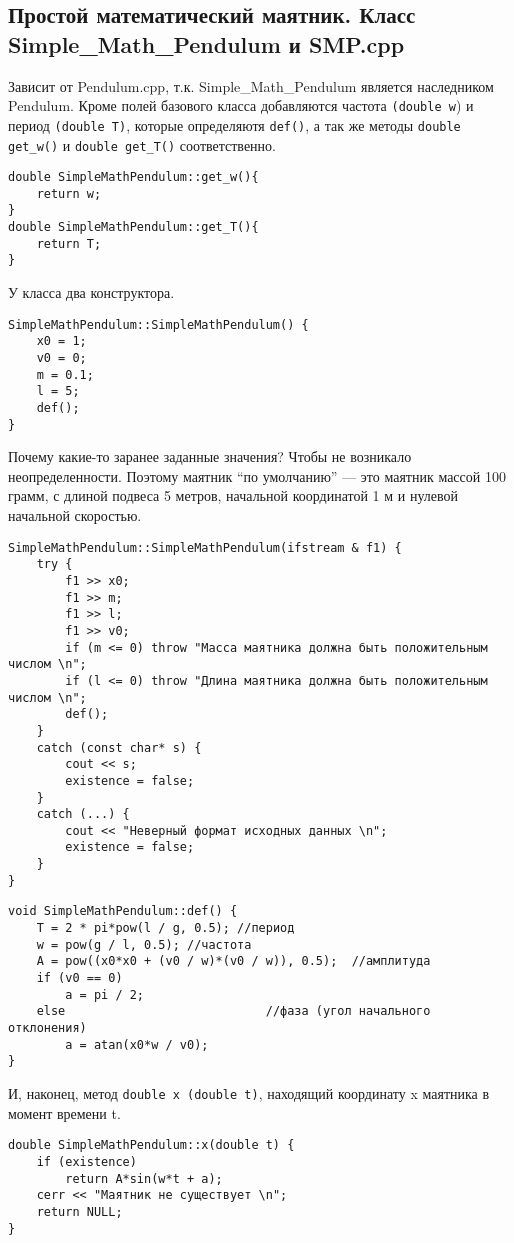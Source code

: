\documentclass {report}
\begin{document}
\subsection{Простой математический маятник. Класс Simple\_Math\_Pendulum и SMP.cpp}
Зависит от Pendulum.cpp, т.к. Simple\_Math\_Pendulum является наследником Pendulum. Кроме полей базового класса добавляются частота \texttt{(double w}) и период \texttt{(double T)}, которые определяютя \texttt{def()}, а так же методы \texttt{double get\_w()} и \texttt{double get\_T()} соответственно. 
\begin{lstlisting}
double SimpleMathPendulum::get_w(){
	return w;
}
double SimpleMathPendulum::get_T(){
	return T;
}
\end{lstlisting}
\newpage
У класса два конструктора.
\begin{lstlisting}[caption = Так определится простой математический маятник по умолчанию]
SimpleMathPendulum::SimpleMathPendulum() {
	x0 = 1;
	v0 = 0;
	m = 0.1;
	l = 5;
	def();
}
\end{lstlisting}
Почему какие-то заранее заданные значения? Чтобы не возникало неопределенности. Поэтому маятник ``по умолчанию'' --- это маятник массой 100 грамм, с длиной подвеса 5 метров, начальной координатой 1 м и нулевой начальной скоростью. 
\begin{lstlisting}[caption = Так можно считать маятник из файлового потока]
SimpleMathPendulum::SimpleMathPendulum(ifstream & f1) {
	try {
		f1 >> x0;
		f1 >> m;
		f1 >> l;
		f1 >> v0;
		if (m <= 0) throw "Масса маятника должна быть положительным числом \n";
		if (l <= 0) throw "Длина маятника должна быть положительным числом \n";
		def();
	}
	catch (const char* s) {
		cout << s;
		existence = false;
	}
	catch (...) {
		cout << "Неверный формат исходных данных \n";
		existence = false;
	}
}
\end{lstlisting}
\begin{lstlisting}[caption = Определение SMP. Метод def()]
void SimpleMathPendulum::def() {
	T = 2 * pi*pow(l / g, 0.5);	//период
	w = pow(g / l, 0.5); //частота
	A = pow((x0*x0 + (v0 / w)*(v0 / w)), 0.5);	//амплитуда
	if (v0 == 0)
		a = pi / 2;
	else							//фаза (угол начального отклонения)				
		a = atan(x0*w / v0);
}
\end{lstlisting}
И, наконец, метод \texttt{double x (double t)}, находящий координату x маятника в момент времени t.
\begin{lstlisting}[caption = Уравнение движения. Метод x(t).]
double SimpleMathPendulum::x(double t) {
	if (existence)
		return A*sin(w*t + a);
	cerr << "Маятник не существует \n";
	return NULL;
}
\end{lstlisting}
\end{document}
